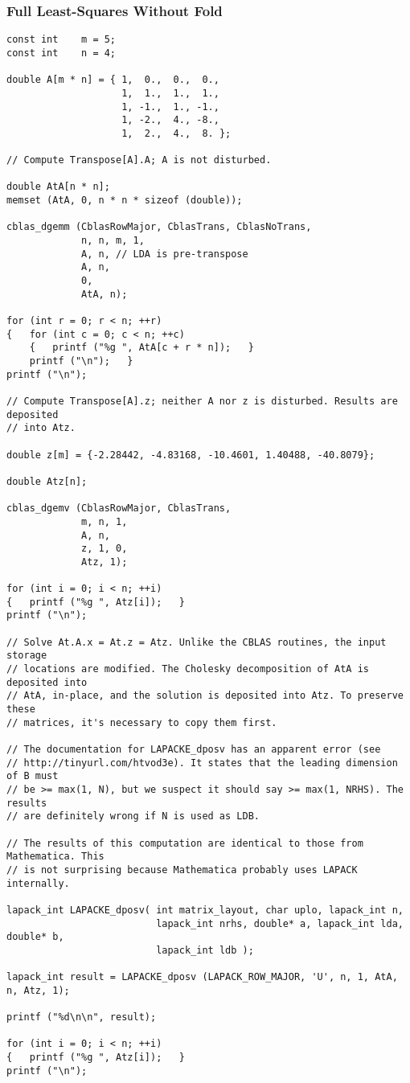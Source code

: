 \documentclass[10pt,oneside,x11names]{article}
\begin{document}
\subsubsection{Full Least-Squares Without Fold}
\label{sec:orgheadline18}

\begin{verbatim}
const int    m = 5;
const int    n = 4;

double A[m * n] = { 1,  0.,  0.,  0.,
                    1,  1.,  1.,  1.,
                    1, -1.,  1., -1.,
                    1, -2.,  4., -8.,
                    1,  2.,  4.,  8. };

// Compute Transpose[A].A; A is not disturbed.

double AtA[n * n];
memset (AtA, 0, n * n * sizeof (double));

cblas_dgemm (CblasRowMajor, CblasTrans, CblasNoTrans,
             n, n, m, 1,
             A, n, // LDA is pre-transpose
             A, n,
             0,
             AtA, n);

for (int r = 0; r < n; ++r)
{   for (int c = 0; c < n; ++c)
    {   printf ("%g ", AtA[c + r * n]);   }
    printf ("\n");   }
printf ("\n");

// Compute Transpose[A].z; neither A nor z is disturbed. Results are deposited
// into Atz.

double z[m] = {-2.28442, -4.83168, -10.4601, 1.40488, -40.8079};

double Atz[n];

cblas_dgemv (CblasRowMajor, CblasTrans,
             m, n, 1,
             A, n,
             z, 1, 0,
             Atz, 1);

for (int i = 0; i < n; ++i)
{   printf ("%g ", Atz[i]);   }
printf ("\n");

// Solve At.A.x = At.z = Atz. Unlike the CBLAS routines, the input storage
// locations are modified. The Cholesky decomposition of AtA is deposited into
// AtA, in-place, and the solution is deposited into Atz. To preserve these
// matrices, it's necessary to copy them first.

// The documentation for LAPACKE_dposv has an apparent error (see
// http://tinyurl.com/htvod3e). It states that the leading dimension of B must
// be >= max(1, N), but we suspect it should say >= max(1, NRHS). The results
// are definitely wrong if N is used as LDB.

// The results of this computation are identical to those from Mathematica. This
// is not surprising because Mathematica probably uses LAPACK internally.

lapack_int LAPACKE_dposv( int matrix_layout, char uplo, lapack_int n,
                          lapack_int nrhs, double* a, lapack_int lda, double* b,
                          lapack_int ldb );

lapack_int result = LAPACKE_dposv (LAPACK_ROW_MAJOR, 'U', n, 1, AtA, n, Atz, 1);

printf ("%d\n\n", result);

for (int i = 0; i < n; ++i)
{   printf ("%g ", Atz[i]);   }
printf ("\n");
\end{verbatim}
\end{document}
